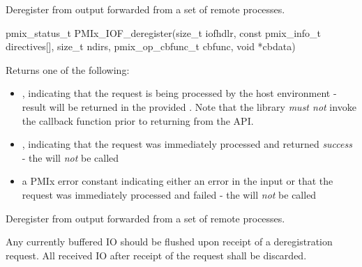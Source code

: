 \summary

Deregister from output forwarded from a set of remote processes.

\format

\cspecificstart
\begin{codepar}
pmix_status_t
PMIx_IOF_deregister(size_t iofhdlr,
                    const pmix_info_t directives[], size_t ndirs,
                    pmix_op_cbfunc_t cbfunc, void *cbdata)
\end{codepar}
\cspecificend

\begin{arglist}
\end{arglist}

Returns one of the following:

\begin{itemize}
    \item {}, indicating that the request is being processed by the host environment - result will be returned in the provided . Note that the library \emph{must not} invoke the callback function prior to returning from the \ac{API}.
    \item {}, indicating that the request was immediately processed and returned \textit{success} - the  will \textit{not} be called
    \item a PMIx error constant indicating either an error in the input or that the request was immediately processed and failed - the  will \textit{not} be called
\end{itemize}

\descr

Deregister from output forwarded from a set of remote processes.

\adviceimplstart
Any currently buffered \ac{IO} should be flushed upon receipt of a deregistration request. All received \ac{IO} after receipt of the request shall be discarded.
\adviceimplend


